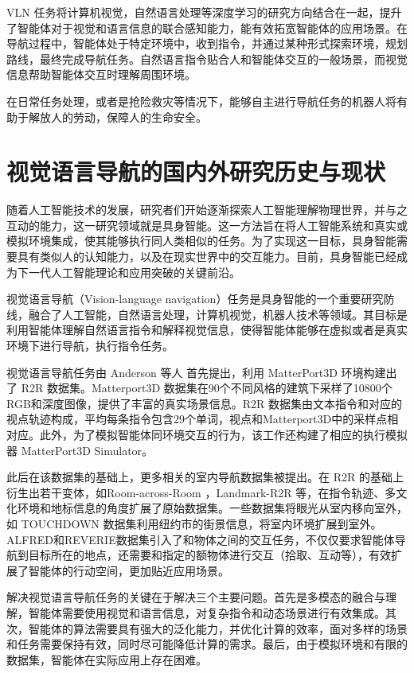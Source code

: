 \documentclass[bachelor]{thesis-uestc}
\begin{document}
VLN 任务将计算机视觉，自然语言处理等深度学习的研究方向结合在一起，提升了智能体对于视觉和语言信息的联合感知能力，能有效拓宽智能体的应用场景。在导航过程中，智能体处于特定环境中，收到指令，并通过某种形式探索环境，规划路线，最终完成导航任务。自然语言指令贴合人和智能体交互的一般场景，而视觉信息帮助智能体交互时理解周围环境。

在日常任务处理，或者是抢险救灾等情况下，能够自主进行导航任务的机器人将有助于解放人的劳动，保障人的生命安全。


\section{视觉语言导航的国内外研究历史与现状}
随着人工智能技术的发展，研究者们开始逐渐探索人工智能理解物理世界，并与之互动的能力，这一研究领域就是具身智能。这一方法旨在将人工智能系统和真实或模拟环境集成，使其能够执行同人类相似的任务。为了实现这一目标，具身智能需要具有类似人的认知能力，以及在现实世界中的交互能力。目前，具身智能已经成为下一代人工智能理论和应用突破的关键前沿。

视觉语言导航（Vision-language navigation）任务是具身智能的一个重要研究防线，融合了人工智能，自然语言处理，计算机视觉，机器人技术等领域。其目标是利用智能体理解自然语言指令和解释视觉信息，使得智能体能够在虚拟或者是真实环境下进行导航，执行指令任务。

视觉语言导航任务由 Anderson 等人\cite{anderson2018visionandlanguage} 首先提出，利用 MatterPort3D 环境构建出了 R2R 数据集。Matterport3D 数据集在90个不同风格的建筑下采样了10800个RGB和深度图像，提供了丰富的真实场景信息。R2R 数据集由文本指令和对应的视点轨迹构成，平均每条指令包含29个单词，视点和Matterport3D\cite{changMatterport3DLearningRGBD2017}中的采样点相对应。此外，为了模拟智能体同环境交互的行为，该工作还构建了相应的执行模拟器 MatterPort3D Simulator。

此后在该数据集的基础上，更多相关的室内导航数据集被提出。在 R2R 的基础上衍生出若干变体，如Room-across-Room \cite{ku2020roomacrossroom}，Landmark-R2R \cite{heLandmarkRxRSolvingVisionandLanguage2021}等，在指令轨迹、多文化环境和地标信息的角度扩展了原始数据集。一些数据集将眼光从室内移向室外，如 TOUCHDOWN 数据集\cite{chenTOUCHDOWNNaturalLanguage2019}利用纽约市的街景信息，将室内环境扩展到室外。ALFRED\cite{shridharALFREDBenchmarkInterpreting2020}和REVERIE\cite{qiREVERIERemoteEmbodied2020}数据集引入了和物体之间的交互任务，不仅仅要求智能体导航到目标所在的地点，还需要和指定的额物体进行交互（拾取、互动等），有效扩展了智能体的行动空间，更加贴近应用场景。

解决视觉语言导航任务的关键在于解决三个主要问题。首先是多模态的融合与理解，智能体需要使用视觉和语言信息，对复杂指令和动态场景进行有效集成。其次，智能体的算法需要具有强大的泛化能力，并优化计算的效率，面对多样的场景和任务需要保持有效，同时尽可能降低计算的需求。最后，由于模拟环境和有限的数据集，智能体在实际应用上存在困难。
\end{document}
